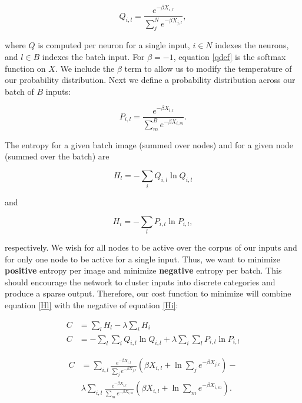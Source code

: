 \begin{equation} \label{qdef}
    Q_{i,l} = \frac{e^{-\beta X_{i,l}}}{\sum_{j}^{N} e^{-\beta X_{j,l}}},
\end{equation}

\noindent where $Q$ is computed per neuron for a single input, $i \in N$ indexes the neurons, and $l \in B$ indexes the batch input. For $\beta = -1$, equation \ref{qdef} is the softmax function on $X$. We include the $\beta$ term to allow us to modify the temperature of our probability distribution. Next we define a probability distribution across our batch of $B$ inputs:

\begin{equation} \label{pdef}
    P_{i,l} = \frac{e^{-\beta X_{i,l}}}{\sum_{m}^{B} e^{-\beta X_{i,m}}}.
\end{equation}

\noindent The entropy for a given batch image (summed over nodes) and for a given node (summed over the batch) are

\begin{equation} \label{Hl}
    H_{l} = -\sum_{i} Q_{i,l} \ln Q_{i,l}
\end{equation}

\noindent and

\begin{equation} \label{Hi}
    H_{i} = -\sum_{l} P_{i,l} \ln P_{i,l},
\end{equation}

\noindent respectively. We wish for all nodes to be active over the corpus of our inputs and for only one node to be active for a single input. Thus, we want to minimize \textbf{positive} entropy per image and minimize \textbf{negative} entropy per batch. This should encourage the network to cluster inputs into discrete categories and produce a sparse output. Therefore, our cost function to minimize will combine equation \ref{Hl} with the negative of equation \ref{Hi}:

\begin{displaymath}
\begin{align}

    C& = \sum_{l}H_{l} - \lambda \sum_{i}H_{i}\\

    C& = - \sum_{l}\sum_{i} Q_{i,l} \ln Q_{i,l} + \lambda \sum_{i}\sum_{l} P_{i,l} \ln P_{i,l}
\end{align}
\end{displaymath}

\begin{equation} \label{cost}
\begin{aligned}
    C& = \sum_{i,l}\frac{e^{-\beta X_{i,l}}}{\sum_{j}e^{-\beta X_{j,l}}} \left(\beta X_{i,l} + \ln{\sum_{j}e^{-\beta X_{j,l}}}\right) -\\ 
     & \lambda \sum_{i,l}\frac{e^{-\beta X_{i,l}}}{\sum_{m} e^{-\beta X_{i,m}}} \left(\beta X_{i,l} + \ln{\sum_{m}e^{-\beta X_{i,m}}}\right).
\end{aligned}
\end{equation}

